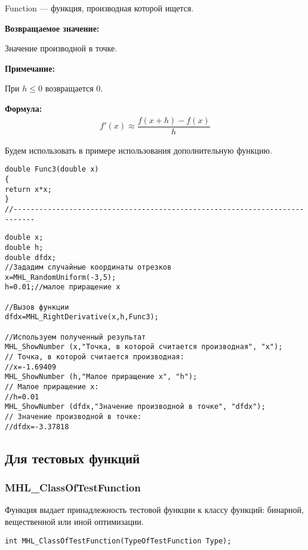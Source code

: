 \documentclass[a4paper,12pt]{article}
\begin{document}
 Function --- функция, производная которой ищется.

\textbf{Возвращаемое значение:}
 
 Значение производной в точке.
 
 \textbf{Примечание:}
 
 При $h\leq0$ возвращается $0$.

\textbf{Формула:}
\begin{eqnarray*}
f'\left( x\right) \approx \dfrac{f\left( x+h\right)-f\left( x\right) }{h}
\end{eqnarray*}

Будем использовать в примере использования дополнительную функцию.

\begin{lstlisting}[caption=Дополнительная функция]
double Func3(double x)
{
return x*x;
}
//---------------------------------------------------------------------------
\end{lstlisting}


\begin{lstlisting}[label=code_use_MHL_RightDerivative,caption=Пример использования]
double x;
double h;
double dfdx;
//Зададим случайные координаты отрезков
x=MHL_RandomUniform(-3,5);
h=0.01;//малое приращение x

//Вызов функции
dfdx=MHL_RightDerivative(x,h,Func3);

//Используем полученный результат
MHL_ShowNumber (x,"Точка, в которой считается производная", "x");
// Точка, в которой считается производная:
//x=-1.69409
MHL_ShowNumber (h,"Малое приращение x", "h");
// Малое приращение x:
//h=0.01
MHL_ShowNumber (dfdx,"Значение производной в точке", "dfdx");
// Значение производной в точке:
//dfdx=-3.37818
\end{lstlisting}

\subsection{Для тестовых функций}

\subsubsection{MHL\_ClassOfTestFunction}\label{MHL_ClassOfTestFunction}

Функция выдает принадлежность тестовой функции к классу функций: бинарной, вещественной или иной оптимизации.


\begin{lstlisting}[label=code_syntax_MHL_ClassOfTestFunction,caption=Синтаксис]
int MHL_ClassOfTestFunction(TypeOfTestFunction Type);
\end{lstlisting}
\end{document}
